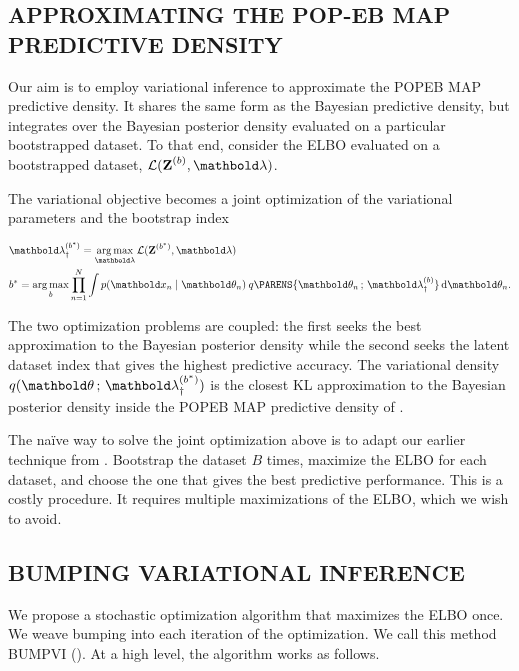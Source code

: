 \subsection{APPROXIMATING THE POP-EB MAP PREDICTIVE DENSITY}
\label{sub:bound}

Our aim is to employ variational inference to approximate
the \gls{POPEB} \gls{MAP} predictive density. It shares the same
form as the Bayesian predictive density, but integrates over the Bayesian
posterior density evaluated on a particular bootstrapped dataset.
To that end, consider the \gls{ELBO} evaluated on a
bootstrapped dataset, $\cL(\mbZ^{(b)}, \mblambda)$.

The variational objective becomes
a joint optimization of the variational parameters and the bootstrap index
\begin{linenomath}
\begin{align*}
  &\mblambda_\dagger^{(b^*)}
  =
  \argmax_{\mblambda}
  \cL(\mbZ^{(b^*)}, \mblambda)\\
  &b^*
  =
  \argmax_{b}
  \prod_{n=1}^N
  \int
  p(\mbx_n \mid \mbtheta_n)
  \:
  q\PARENS{\mbtheta_n \,;\,\mblambda_\dagger^{(b)}}
  \dif\mbtheta_n.
\end{align*}
\end{linenomath}
The two optimization problems are coupled: the first seeks the best
approximation to the Bayesian posterior density while the second seeks the
latent dataset index that gives the highest predictive accuracy. The variational
density $q (\mbtheta \,;\,\mblambda_\dagger^{ (b^*)})$ is the closest
\gls {KL}
approximation to the Bayesian posterior density
inside the \gls{POPEB} \gls{MAP} predictive
density of .

The na\"{i}ve way to solve the joint optimization above is to adapt
our earlier technique from .
Bootstrap the dataset $B$ times, maximize the \gls{ELBO}
for each dataset, and choose the one that gives the best predictive
performance. This is a costly procedure.
It requires multiple maximizations of the \gls{ELBO}, which we wish to avoid.


\subsection{BUMPING VARIATIONAL INFERENCE}

We propose a stochastic optimization algorithm that maximizes the
\gls{ELBO} once. We weave bumping into each iteration of the
optimization. We call this method \gls{BUMPVI} ().
At a high level, the algorithm works as follows.

